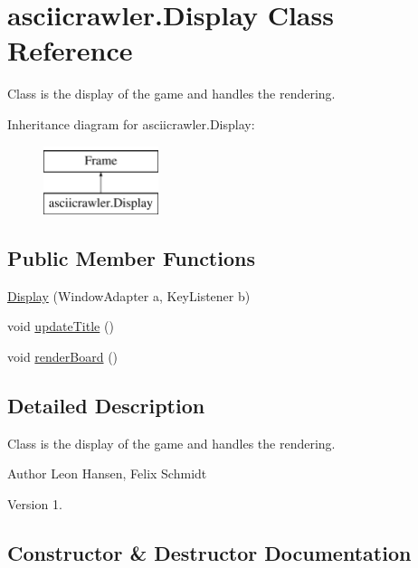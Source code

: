 \hypertarget{classasciicrawler_1_1Display}{}\section{asciicrawler.\+Display Class Reference}
\label{classasciicrawler_1_1Display}


Class is the display of the game and handles the rendering.  


Inheritance diagram for asciicrawler.\+Display\+:\begin{figure}[H]
\begin{center}
\leavevmode
\includegraphics[height=2.000000cm]{classasciicrawler_1_1Display}
\end{center}
\end{figure}
\subsection*{Public Member Functions}
\begin{DoxyCompactItemize}
\item 
\hyperlink{classasciicrawler_1_1Display_a7141b4471b8b75b5c7da12769f4bf46c}{Display} (Window\+Adapter a, Key\+Listener b)
\item 
void \hyperlink{classasciicrawler_1_1Display_afbfb9296a48fa04d148715918230d3b2}{update\+Title} ()
\item 
void \hyperlink{classasciicrawler_1_1Display_ac78b41f2afc6b0732ab4cd54d7142604}{render\+Board} ()
\end{DoxyCompactItemize}


\subsection{Detailed Description}
Class is the display of the game and handles the rendering. 

\begin{DoxyAuthor}{Author}
Leon Hansen, Felix Schmidt 
\end{DoxyAuthor}
\begin{DoxyVersion}{Version}
1. 
\end{DoxyVersion}


\subsection{Constructor \& Destructor Documentation}
\mbox{\label{classasciicrawler_1_1Display_a7141b4471b8b75b5c7da12769f4bf46c}} 

